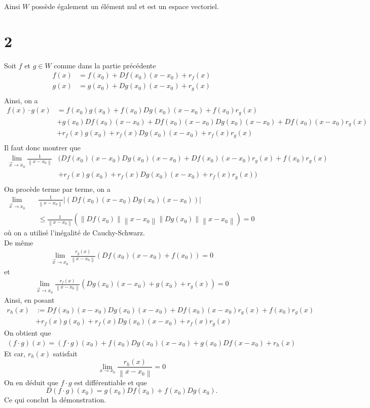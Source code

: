 \documentclass[11pt, a4paper]{article}
\newcommand\N[1]{\left\lVert#1\right\rVert}
\begin{document}
Ainsi $W$ possède également un élément nul et est un espace vectoriel.
\section*{2}
Soit $f$ et $g \in W$ comme dans la partie précédente
\begin{align*}
	f( x) &= f( x_0)  + Df( x_0)  ( x-x_0)  + r_f( x) \\
	g( x) &= g( x_0)  + Dg( x_0)  ( x-x_0)  + r_g( x) \\
\end{align*}
Ainsi, on a
\begin{align*}
	f( x) \cdot g( x) &=  f( x_0) g( x_0) + f( x_0) Dg( x_0)( x-x_0)  + f( x_0) r_g( x)\\
				  &+ g( x_0) Df( x_0)( x-x_0) + Df( x_0)( x-x_0)  Dg( x_0) ( x-x_0)+ Df(x_0 )  ( x-x_0) r_g( x)  \\
				  &+ r_f( x) g( x_0) + r_f( x) Dg( x_0) ( x-x_0) + r_f( x) r_g( x) \\
\end{align*}
Il faut donc montrer que
\begin{align*}
	\lim_{\vec{x} \to x_0} \frac{1}{\N { x-x_0} } &\big( Df( x_0)( x-x_0)  Dg( x_0) ( x-x_0)+ Df(x_0 )  ( x-x_0) r_g( x) + f( x_0) r_g( x) \\
&+ r_f( x) g( x_0) + r_f( x) Dg( x_0) ( x-x_0) + r_f( x) r_g( x)\big)\\
\end{align*}
On procède terme par terme, on a
\begin{align*}
\lim_{\vec{x} \to x_0}\quad &\frac{1}{\N { x-x_0} } \vert( Df( x_0)( x-x_0)  Dg( x_0) ( x-x_0) )\vert\\
&\leq \frac{1}{\N { x-x_0} } ( \N { Df( x_0) } \N { x-x_0} \N { Dg( x_0) } \N { x-x_0}  ) =0
\end{align*}
où on a utilisé l'inégalité de Cauchy-Schwarz.\\
De même
\begin{align*}
	\lim_{\vec{x} \to x_0} \frac{r_g( x) }{\N { x-x_0} } ( Df( x_0) ( x-x_0)  + f( x_0)  )  = 0
\end{align*}
et
\begin{align*}
	\lim_{\vec{x} \to x_0} \frac{r_f( x) }{\N { x-x_0} } ( Dg( x_0) ( x-x_0)  + g( x_0) + r_g( x)   )  = 0
\end{align*}
Ainsi, en posant
\begin{align*}
	r_h ( x)  &:= Df( x_0)( x-x_0)  Dg( x_0) ( x-x_0)+ Df(x_0 )  ( x-x_0) r_g( x) + f( x_0) r_g( x) \\
&+ r_f( x) g( x_0) + r_f( x) Dg( x_0) ( x-x_0) + r_f( x) r_g( x)
\end{align*}
On obtient que
\begin{align*}
	( f\cdot g) ( x) = ( f\cdot g) ( x_0) + f( x_0) Dg( x_0) ( x-x_0)  + g( x_0) Df( x-x_0)  + r_h( x) 
\end{align*}
Et car, $r_h( x) $ satisfait
\[ 
	\lim_{x \to x_0} \frac{r_h( x) }{\N { x-x_0} } =0
\]
On en déduit que $f \cdot g$ est différentiable et que
\[ 
	D( f\cdot g)( x_0)  =  g(x_0 ) Df( x_0)   + f( x_0)  Dg( x_0) .
\]
Ce qui conclut la démonstration.
\end{document}
